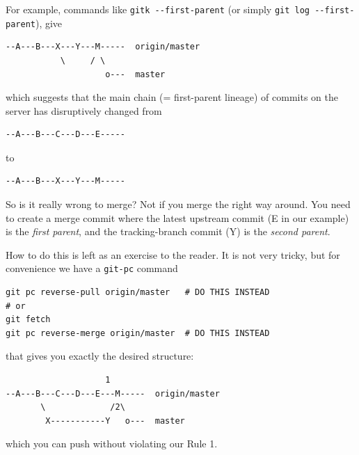 \documentclass[12pt,pdftex]{article}
\begin{document}
For example, commands like \texttt{gitk -{}-first-parent} (or simply \texttt{git log
  -{}-first-parent}), give
\begin{verbatim}
--A---B---X---Y---M-----  origin/master
           \     / \
                    o---  master
\end{verbatim}
which suggests that the main chain (= first-parent lineage) of commits
on the server has disruptively changed from
\begin{verbatim}
--A---B---C---D---E-----
\end{verbatim}
to
\begin{verbatim}
--A---B---X---Y---M-----
\end{verbatim}



\bigskip

So is it really wrong to merge?
Not if you merge the right way around.
You need to create a merge commit where the latest upstream commit (E
in our example) is the \emph{first parent}, and the tracking-branch commit
(Y) is the \emph{second parent}.

How to do this is left as an exercise to the reader.
It is not very tricky, but for convenience we have a \texttt{git-pc} command
\lstset{frame=single,basicstyle=\ttfamily\footnotesize,language=sh,label= ,caption= ,captionpos=b,numbers=none}
\begin{lstlisting}
git pc reverse-pull origin/master   # DO THIS INSTEAD
# or
git fetch
git pc reverse-merge origin/master  # DO THIS INSTEAD
\end{lstlisting}
that gives you exactly the desired structure:
\begin{verbatim}
                    1
--A---B---C---D---E---M-----  origin/master
       \             /2\
        X-----------Y   o---  master
\end{verbatim}
which you can push without violating our Rule 1.
\end{document}
